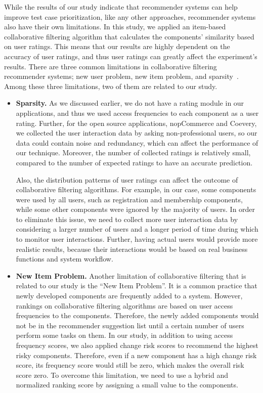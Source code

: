 While the results of our study indicate that recommender systems can help
improve test case prioritization, like any other approaches, recommender 
systems also have their own limitations. 
In this study, we applied an item-based collaborative
filtering algorithm that calculates the components' similarity based
on user ratings. This means that our results are highly dependent on 
the accuracy of user ratings, and thus user ratings can greatly affect 
the experiment's results.
There are three common limitations in collaborative filtering recommender systems;
new user problem, new item problem, and sparsity~\cite{recomsurvey05}. 
Among these three limitations, two of them are related to our study. 

\begin{itemize}
	\item{\textbf{Sparsity.}}	
	As we discussed earlier, we do not have a rating module in our
	applications, and thus we used access frequencies to each component
	as a user rating. Further, for the open source applications, nopCommerce 
    and Coevery, we collected the user interaction data
	by asking non-professional users, so our data could contain noise and 
	redundancy, which can affect the performance of our technique. 
	Moreover, the number of collected ratings is relatively small, compared 
	to the number of expected ratings to have an accurate prediction.
	
	Also, the distribution patterns of user ratings can affect the outcome
    of collaborative filtering algorithms. For example, in our case, 
	some components were used by all users,
	such as registration and membership components, while some other
	components were ignored by the majority of users. 
	In order to eliminate this issue, we need to collect more user 
        interaction data by considering a larger number of users and a longer 
        period of time during which to monitor user interactions.
	Further, having actual users would provide more realistic results, because
        their interactions would be based on real business functions and system workflow.
	
	\item{\textbf{New Item Problem.}}	
	Another limitation of collaborative filtering that is related to
	our study is the ``New Item Problem''. It is a common practice that
	newly developed components are frequently added to a system. 
	However, rankings on collaborative filtering algorithms are 
        based on user access frequencies to the components. Therefore, 
        the newly added components would not be in the recommender suggestion 
        list until a certain number of users perform some tasks on them. 
	In our study, in addition to using access frequency scores, 
        we also applied change risk scores to recommend the highest risky components.
	Therefore, even if a new component has a high change risk score,
         its frequency score would still be zero, which makes the overall 
        risk score zero. To overcome this limitation, we need
	to use a hybrid and normalized ranking score by assigning 
        a small value to the components.
\end{itemize}
